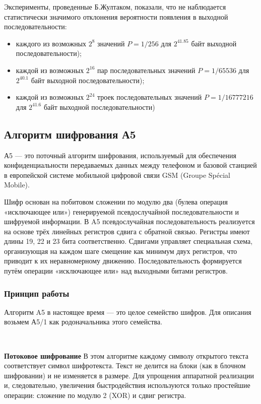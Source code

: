 \documentclass[a4paper]{report}
\begin{document}
 Эксперименты, проведенные Б.Жултаком, показали, что не наблюдается статистически значимого отклонения вероятности появления в выходной последовательности:
\begin{itemize}
\item каждого из возможных $2^{8}$  значений $P=1/256$  для $2^{41.85}$  байт выходной последовательности);
\item каждой из возможных $2^{16}$ пар последовательных значений $P=1/65536$ для $2^{40.1}$ байт выходной последовательности);
\item каждой из возможных $2^{24}$ троек последовательных значений $P=1/16777216$ для $2^{41.6}$ байт выходной последовательности)
\end{itemize}

\subsection{Алгоритм шифрования А5}

А5 — это поточный алгоритм шифрования, используемый для обеспечения конфиденциальности передаваемых данных между телефоном и базовой станцией в европейской системе мобильной цифровой связи GSM (Groupe Spécial Mobile).

Шифр основан на побитовом сложении по модулю два (булева операция «исключающее или») генерируемой псевдослучайной последовательности и шифруемой информации. В A5 псевдослучайная последовательность реализуется на основе трёх линейных регистров сдвига с обратной связью. Регистры имеют длины 19, 22 и 23 бита соответственно. Сдвигами управляет специальная схема, организующая на каждом шаге смещение как минимум двух регистров, что приводит к их неравномерному движению. Последовательность формируется путём операции «исключающее или» над выходными битами регистров.

\subsubsection{Принцип работы}
Алгоритм A5 в настоящее время — это целое семейство шифров. Для описания возьмем А5/1 как родоначальника этого семейства.

~

\textbf{Потоковое шифрование}
В этом алгоритме каждому символу открытого текста соответствует символ шифротекста. Текст не делится на блоки (как в блочном шифровании) и не изменяется в размере. Для упрощения аппаратной реализации и, следовательно, увеличения быстродействия используются только простейшие операции: сложение по модулю 2 (XOR) и сдвиг регистра.
\end{document}
